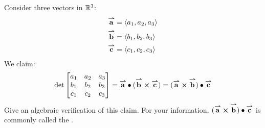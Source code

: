 \documentclass[handout,nooutcomes,noauthor]{ximera}
\begin{document}
\begin{problem}
  Consider three vectors in $\R^3$:
  \begin{align*}
    \vec{a} &= \vector{a_1,a_2,a_3}\\
    \vec{b} &= \vector{b_1,b_2,b_3}\\
    \vec{c} &= \vector{c_1,c_2,c_3}
  \end{align*}
    We claim:
    \[
    \det \begin{bmatrix}
      a_1 & a_2 & a_3\\
      b_1 & b_2 & b_3\\
      c_1 & c_2 & c_3
    \end{bmatrix}
    =
      \vec{a}\dotp(\vec{b}\cross\vec{c}) =
    (\vec{a}\cross\vec{b})\dotp\vec{c}
    \]
    Give an algebraic verification of this claim.  For your
    information, $(\vec{a}\cross\vec{b})\dotp \vec{c}$ is commonly
    called the .
 \end{problem}
\end{document}
